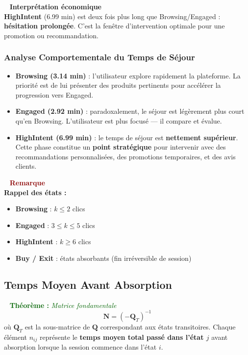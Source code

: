 \documentclass[11pt,a4paper]{article}
\newenvironment{thmbox}[1]{%
  \vspace{3pt}\begin{framed}
  \noindent{\color{DarkGreen}\rule{0.3cm}{3pt}}~%
  \textcolor{DarkGreen}{\textbf{Théorème :} \textit{#1}}\\[3pt]}
  {\end{framed}\vspace{3pt}}
\newenvironment{insightbox}{%
  \vspace{3pt}\begin{framed}
  \noindent{\color{NavyBlue}\rule{0.3cm}{3pt}}~%
  \textcolor{NavyBlue}{\textbf{Interprétation économique}}\\[3pt]}
  {\end{framed}\vspace{3pt}}
\newenvironment{warnbox}{%
  \vspace{3pt}\begin{framed}
  \noindent{\color{DarkRed}\rule{0.3cm}{3pt}}~%
  \textcolor{DarkRed}{\textbf{Remarque}}\\[3pt]}
  {\end{framed}\vspace{3pt}}
\newcommand{\mat}[1]{\mathbf{#1}}
\begin{document}
\begin{insightbox}
\textbf{HighIntent} (6.99 min) est deux fois plus long que Browsing/Engaged :
\textbf{hésitation prolongée}. C'est la fenêtre d'intervention optimale pour
une promotion ou recommandation.
\end{insightbox}

\subsubsection{Analyse Comportementale du Temps de Séjour}

\begin{itemize}[leftmargin=2cm,itemsep=4pt]
  \item \textbf{Browsing (3.14 min)} : l'utilisateur explore rapidement la plateforme.
  La priorité est de lui présenter des produits pertinents pour accélérer la progression vers Engaged.
  \item \textbf{Engaged (2.92 min)} : paradoxalement, le séjour est légèrement plus court qu'en Browsing.
  L'utilisateur est plus focusé --- il compare et évalue.
  \item \textbf{HighIntent (6.99 min)} : le temps de séjour est \textbf{nettement supérieur}.
  Cette phase constitue un \textbf{point stratégique} pour intervenir avec des recommandations
  personnalisées, des promotions temporaires, et des avis clients.
\end{itemize}

\begin{warnbox}
\textbf{Rappel des états :}
\begin{itemize}[leftmargin=1.5cm,itemsep=0pt]
  \item \textbf{Browsing} : $k \leq 2$ clics
  \item \textbf{Engaged} : $3 \leq k \leq 5$ clics
  \item \textbf{HighIntent} : $k \geq 6$ clics
  \item \textbf{Buy / Exit} : états absorbants (fin irréversible de session)
\end{itemize}
\end{warnbox}

\subsection{Temps Moyen Avant Absorption}

\begin{thmbox}{Matrice fondamentale}
\[
\mat{N} = (-\mat{Q}_T)^{-1}
\]
où $\mat{Q}_T$ est la sous-matrice de $\mat{Q}$ correspondant aux états transitoires.
Chaque élément $n_{ij}$ représente le \textbf{temps moyen total passé dans l'état $j$}
avant absorption lorsque la session commence dans l'état $i$.
\end{thmbox}
\end{document}
